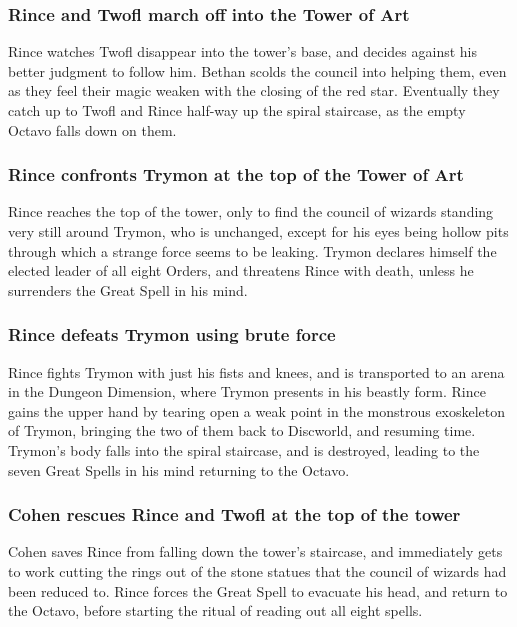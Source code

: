 \subsubsection{\Gls{Rince} and \Gls{Twofl} march off into the Tower of Art}
\Gls{Rince} watches \Gls{Twofl} disappear into the tower's base, and decides against his better
judgment to follow him. \Gls{Bethan} scolds the council into helping them, even as they feel their
magic weaken with the closing of the red star. Eventually they catch up to \Gls{Twofl} and
\Gls{Rince} half-way up the spiral staircase, as the empty Octavo falls down on them.

\subsubsection{\Gls{Rince} confronts \Gls{Trymon} at the top of the Tower of Art}
\Gls{Rince} reaches the top of the tower, only to find the council of wizards standing very still
around \Gls{Trymon}, who is unchanged, except for his eyes being hollow pits through which a strange
force seems to be leaking. \Gls{Trymon} declares himself the elected leader of all eight Orders,
and threatens \Gls{Rince} with death, unless he surrenders the Great Spell in his mind.

\subsubsection{\Gls{Rince} defeats \Gls{Trymon} using brute force}
\Gls{Rince} fights \Gls{Trymon} with just his fists and knees, and is transported to an arena in
the Dungeon Dimension, where \Gls{Trymon} presents in his beastly form. \Gls{Rince} gains the upper
hand by tearing open a weak point in the monstrous exoskeleton of \Gls{Trymon}, bringing the two of
them back to Discworld, and resuming time. \Gls{Trymon}'s body falls into the spiral staircase, and
is destroyed, leading to the seven Great Spells in his mind returning to the Octavo.

\subsubsection{\Gls{Cohen} rescues \Gls{Rince} and \Gls{Twofl} at the top of the tower}
\Gls{Cohen} saves \Gls{Rince} from falling down the tower's staircase, and immediately gets to work
cutting the rings out of the stone statues that the council of wizards had been reduced to.
\Gls{Rince} forces the Great Spell to evacuate his head, and return to the Octavo, before starting
the ritual of reading out all eight spells.

